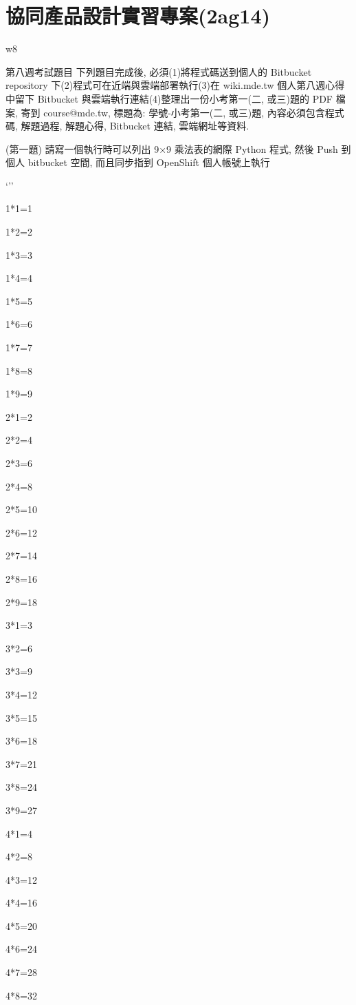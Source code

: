 \documentclass[]{article}
\begin{document}
\section{﻿協同產品設計實習專案(2ag14)}\label{ux5354ux540cux7522ux54c1ux8a2dux8a08ux5be6ux7fd2ux5c08ux68482ag14}

w8

第八週考試題目 下列題目完成後, 必須(1)將程式碼送到個人的 Bitbucket
repository 下(2)程式可在近端與雲端部署執行(3)在 wiki.mde.tw
個人第八週心得中留下 Bitbucket 與雲端執行連結(4)整理出一份小考第一(二,
或三)題的 PDF 檔案, 寄到 course@mde.tw, 標題為: 學號-小考第一(二,
或三)題, 內容必須包含程式碼, 解題過程, 解題心得, Bitbucket 連結,
雲端網址等資料.

(第一題) 請寫一個執行時可以列出 9×9 乘法表的網際 Python 程式, 然後 Push
到個人 bitbucket 空間, 而且同步指到 OpenShift 個人帳號上執行

`''

1*1=1

1*2=2

1*3=3

1*4=4

1*5=5

1*6=6

1*7=7

1*8=8

1*9=9

2*1=2

2*2=4

2*3=6

2*4=8

2*5=10

2*6=12

2*7=14

2*8=16

2*9=18

3*1=3

3*2=6

3*3=9

3*4=12

3*5=15

3*6=18

3*7=21

3*8=24

3*9=27

4*1=4

4*2=8

4*3=12

4*4=16

4*5=20

4*6=24

4*7=28

4*8=32
\end{document}
